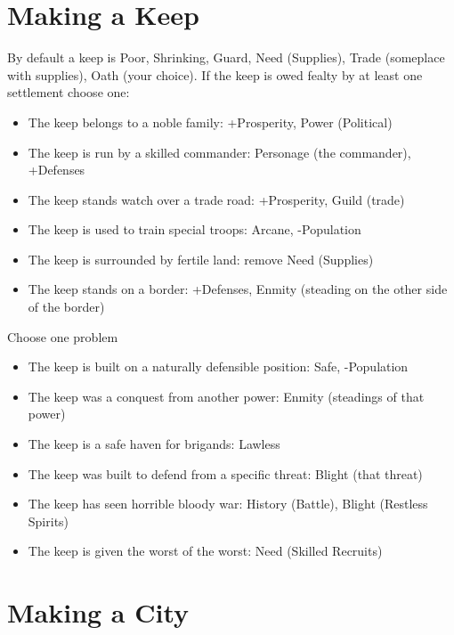 \section{Making a Keep}


 By default a keep is Poor, Shrinking, Guard, Need (Supplies), Trade (someplace with supplies), Oath (your choice). If the keep is owed fealty by at least one settlement choose one:
\begin{itemize}
\item The keep belongs to a noble family: +Prosperity, Power (Political)
\item The keep is run by a skilled commander: Personage (the commander), +Defenses
\item The keep stands watch over a trade road: +Prosperity, Guild (trade)
\item The keep is used to train special troops: Arcane, -Population
\item The keep is surrounded by fertile land: remove Need (Supplies)
\item The keep stands on a border: +Defenses, Enmity (steading on the other side of the border)

\end{itemize}


 Choose one problem
\begin{itemize}
\item The keep is built on a naturally defensible position: Safe, -Population
\item The keep was a conquest from another power: Enmity (steadings of that power)
\item The keep is a safe haven for brigands: Lawless
\item The keep was built to defend from a specific threat: Blight (that threat)
\item The keep has seen horrible bloody war: History (Battle), Blight (Restless Spirits)
\item The keep is given the worst of the worst: Need (Skilled Recruits)

\end{itemize}
\section{Making a City}


